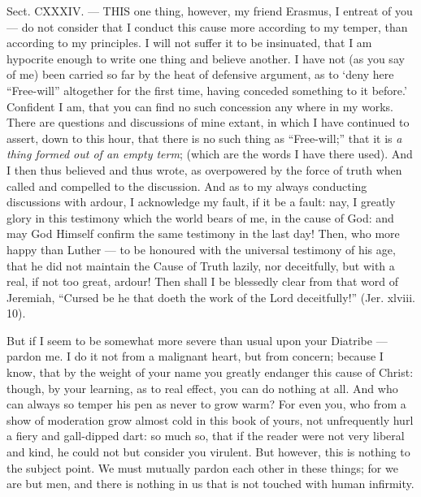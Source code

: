 Sect. CXXXIV. — THIS one thing, however, my friend Erasmus, I entreat of you — do not consider that I conduct this cause more according to my temper, than according to my principles. I will not suffer it to be insinuated, that I am hypocrite enough to write one thing and believe another. I have not (as you say of me) been carried so far by the heat of defensive argument, as to ‘deny here “Free-will” altogether for the first time, having conceded something to it before.’ Confident I am, that you can find no such concession any where in my works. There are questions and discussions of mine extant, in which I have continued to assert, down to this hour, that there is no such thing as “Free-will;” that it is \emph{a thing formed out of an empty term}; (which are the words I have there used). And I then thus believed and thus wrote, as overpowered by the force of truth when called and compelled to the discussion. And as to my always conducting discussions with ardour, I acknowledge my fault, if it be a fault: nay, I greatly glory in this testimony which the world bears of me, in the cause of God: and may God Himself confirm the same testimony in the last day! Then, who more happy than Luther — to be honoured with the universal testimony of his age, that he did not maintain the Cause of Truth lazily, nor deceitfully, but with a real, if not too great, ardour! Then shall I be blessedly clear from that word of Jeremiah, “Cursed be he that doeth the work of the Lord deceitfully!” (Jer. xlviii. 10).

But if I seem to be somewhat more severe than usual upon your Diatribe — pardon me. I do it not from a malignant heart, but from concern; because I know, that by the weight of your name you greatly endanger this cause of Christ: though, by your learning, as to real effect, you can do nothing at all. And who can always so temper his pen as never to grow warm? For even you, who from a show of moderation grow almost cold in this book of yours, not unfrequently hurl a fiery and gall-dipped dart: so much so, that if the reader were not very liberal and kind, he could not but consider you virulent. But however, this is nothing to the subject point. We must mutually pardon each other in these things; for we are but men, and there is nothing in us that is not touched with human infirmity.


